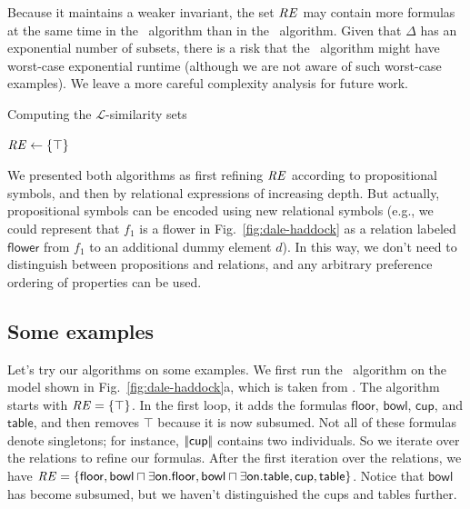 Because it maintains a weaker invariant, the set $\mathit{RE}$ may contain
more formulas at the same time in the \el\ algorithm than in the \alc\
algorithm.  Given that $\Delta$ has an exponential number of subsets,
there is a risk that the \el\ algorithm might have worst-case
exponential runtime (although we are not aware of such worst-case
examples).  We leave a more careful complexity analysis for future work.

\begin{algorithm}[t]
\dontprintsemicolon
\caption{Computing the $\mathcal{L}$-similarity sets}
\label{algo:bisim-l}

$\mathit{RE} \leftarrow \{\top\}$


\end{algorithm}


We presented both algorithms as first refining $\mathit{RE}$ according to
propositional symbols, and then by relational expressions of
increasing depth. But actually, propositional symbols can be encoded
using new relational symbols (e.g., we could represent that $f_1$ is a
flower in Fig.~\ref{fig:dale-haddock} as a relation labeled
$\mathsf{flower}$ from $f_1$ to an additional dummy element $d$).  In
this way, we don't need to distinguish between propositions and
relations, and any arbitrary preference ordering of properties can be
used.


\subsection{Some examples}\label{sec:examples}

Let's try our algorithms on some examples.  We first run the \el\
algorithm on the model shown in Fig.~\ref{fig:dale-haddock}a, which is
taken from \newcite{dale91:_gener_refer_expres_invol_relat}.  The
algorithm starts with $\mathit{RE} = \{\top\}$.  In the first loop, it adds
the formulas $\mathsf{floor}$, $\mathsf{bowl}$, $\mathsf{cup}$, and
$\mathsf{table}$, and then removes $\top$ because it is now subsumed.
Not all of these formulas denote singletons; for instance,
$|\!|\mathsf{cup}|\!|$ contains two individuals.  So we iterate over
the relations to refine our formulas.  After the first iteration over
the relations, we have $\mathit{RE} = \{ \mathsf{floor}, \mathsf{bowl} \sqcap
\exists \mathsf{on}.\mathsf{floor}, \mathsf{bowl} \sqcap \exists
\mathsf{on}.\mathsf{table}, \mathsf{cup}, \mathsf{table} \}$. Notice
that $\mathsf{bowl}$ has become subsumed, but we haven't distinguished
the cups and tables further.



